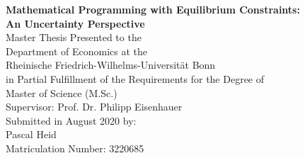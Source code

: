 \begin{titlepage}

\begin{center}

\vspace*{1.0cm}

{\LARGE
\bfseries Mathematical Programming with Equilibrium Constraints: \\
\vspace*{0.5cm}
An Uncertainty Perspective
}
\\


{\large
\vspace*{4.0cm}
Master Thesis Presented to the\\
\vspace*{0.25cm}
Department of Economics at the\\
\vspace*{0.25cm}
Rheinische Friedrich-Wilhelms-Universität Bonn\\

\vspace*{2.0cm}
in Partial Fulfillment of the Requirements for the Degree of\\
\vspace*{0.25cm}
Master of Science (M.Sc.)\\

\vspace*{4.0cm}
Supervisor: Prof. Dr. Philipp Eisenhauer\\

\vspace*{2.0cm}
Submitted in August 2020 by:\\
Pascal Heid\\
Matriculation Number: 3220685
}

\end{center}

\end{titlepage}
